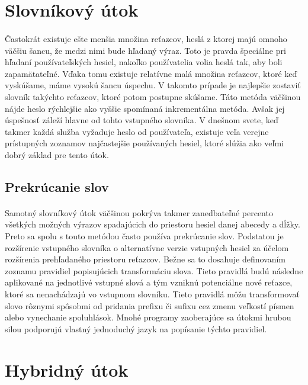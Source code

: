 \section{Slovníkový útok}
\paragraph{}
Častokrát existuje ešte menšia množina reťazcov, heslá z ktorej majú omnoho väčšiu šancu, že medzi nimi bude hľadaný výraz. Toto je pravda špeciálne pri hľadaní používateľských hesiel, nakoľko používatelia volia heslá tak, aby boli zapamätateľné. Vďaka tomu existuje relatívne malá množina reťazcov, ktoré keď vyskúšame, máme vysokú šancu úspechu. V takomto prípade je najlepšie zostaviť slovník takýchto reťazcov, ktoré potom postupne skúšame. Táto metóda väčšinou nájde heslo rýchlejšie ako vyššie spomínaná inkrementálna metóda. Avšak jej úspešnosť záleží hlavne od tohto vstupného slovníka. V dnešnom svete, keď takmer každá služba vyžaduje heslo od používateľa, existuje veľa verejne prístupných zoznamov najčastejšie používaných hesiel, ktoré slúžia ako veľmi dobrý základ pre tento útok.

\subsection{Prekrúcanie slov}
\paragraph{}
Samotný slovníkový útok väčšinou pokrýva takmer zanedbateľné percento všetkých možných výrazov spadajúcich do priestoru hesiel danej abecedy a dĺžky. Preto sa spolu s touto metódou často používa prekrúcanie slov. Podstatou je rozšírenie vstupného slovníka o alternatívne verzie vstupných hesiel za účelom rozšírenia prehľadaného priestoru reťazcov. Bežne sa to dosahuje definovaním zoznamu pravidiel popisujúcich transformáciu slova. Tieto pravidlá budú následne aplikované na jednotlivé vstupné slová a tým vzniknú potenciálne nové reťazce, ktoré sa nenachádzajú vo vstupnom slovníku. Tieto pravidlá môžu transformovať slovo rôznymi spôsobmi od pridania prefixu či sufixu cez zmenu veľkostí písmen alebo vynechanie spoluhlások. Mnohé programy zaoberajúce sa útokmi hrubou silou podporujú vlastný jednoduchý jazyk na popísanie týchto pravidiel.

\section{Hybridný útok}
